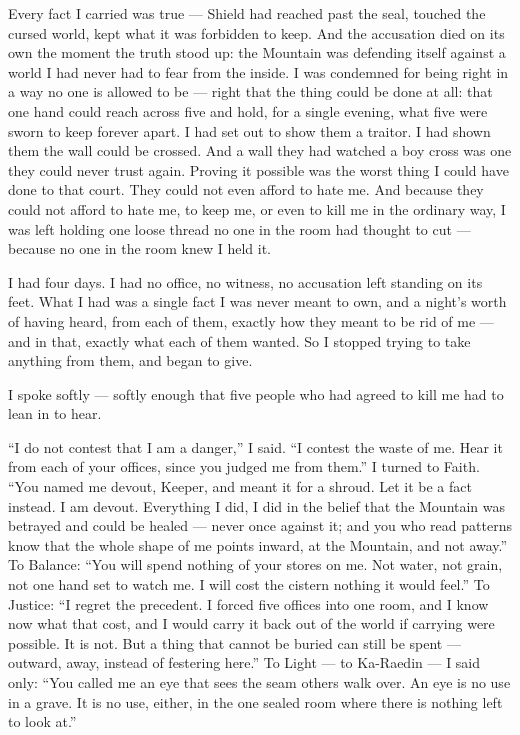Every fact I carried was true --- Shield had reached past the seal, touched the cursed world, kept what it was forbidden to keep. And the accusation died on its own the moment the truth stood up: the Mountain was defending itself against a world I had never had to fear from the inside. I was condemned for being right in a way no one is allowed to be --- right that the thing could be done at all: that one hand could reach across five and hold, for a single evening, what five were sworn to keep forever apart. I had set out to show them a traitor. I had shown them the wall could be crossed. And a wall they had watched a boy cross was one they could never trust again. Proving it possible was the worst thing I could have done to that court. They could not even afford to hate me. And because they could not afford to hate me, to keep me, or even to kill me in the ordinary way, I was left holding one loose thread no one in the room had thought to cut --- because no one in the room knew I held it.\par

\ornament

I had four days. I had no office, no witness, no accusation left standing on its feet. What I had was a single fact I was never meant to own, and a night's worth of having heard, from each of them, exactly how they meant to be rid of me --- and in that, exactly what each of them wanted. So I stopped trying to take anything from them, and began to give.\par

I spoke softly --- softly enough that five people who had agreed to kill me had to lean in to hear.\par

``I do not contest that I am a danger,'' I said. ``I contest the waste of me. Hear it from each of your offices, since you judged me from them.'' I turned to Faith. ``You named me devout, Keeper, and meant it for a shroud. Let it be a fact instead. I am devout. Everything I did, I did in the belief that the Mountain was betrayed and could be healed --- never once against it; and you who read patterns know that the whole shape of me points inward, at the Mountain, and not away.'' To Balance: ``You will spend nothing of your stores on me. Not water, not grain, not one hand set to watch me. I will cost the cistern nothing it would feel.'' To Justice: ``I regret the precedent. I forced five offices into one room, and I know now what that cost, and I would carry it back out of the world if carrying were possible. It is not. But a thing that cannot be buried can still be spent --- outward, away, instead of festering here.'' To Light --- to Ka-Raedin --- I said only: ``You called me an eye that sees the seam others walk over. An eye is no use in a grave. It is no use, either, in the one sealed room where there is nothing left to look at.''\par

